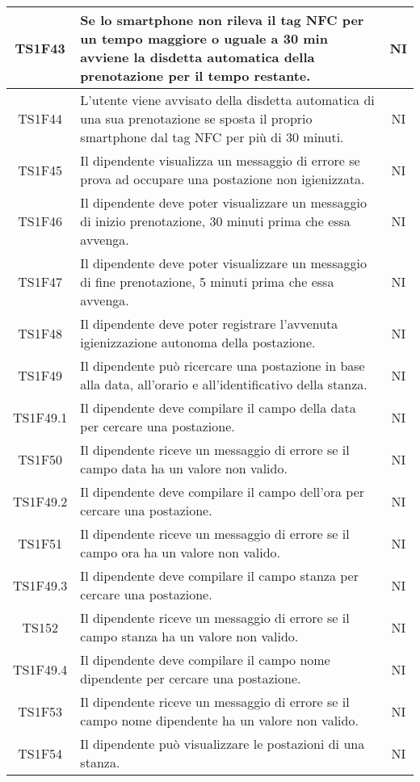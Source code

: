 \begin{center}
\begin{longtable}{|c|p{10cm}|c|}
			\hline					
			TS1F43 & Se lo smartphone non rileva il tag NFC per un tempo maggiore o uguale a 30 min avviene la disdetta automatica della prenotazione per il tempo restante. & NI \\	
			\hline				
			TS1F44 & L’utente viene avvisato della disdetta automatica di una sua prenotazione se sposta il proprio smartphone dal tag NFC per più di 30 minuti. & NI \\	
			\hline				
			TS1F45 & Il dipendente visualizza un messaggio di errore se prova ad occupare una postazione non igienizzata. & NI \\	
			\hline
			TS1F46 & Il dipendente deve poter visualizzare un messaggio di inizio prenotazione, 30 minuti prima che essa avvenga. & NI \\	
			\hline
			TS1F47 & Il dipendente deve poter visualizzare un messaggio di fine prenotazione, 5 minuti prima che essa avvenga. & NI \\	
			\hline
			TS1F48 & Il dipendente deve poter registrare l'avvenuta igienizzazione autonoma della postazione. & NI \\	
			\hline
			TS1F49 & Il dipendente può ricercare una postazione in base alla data, all'orario e all'identificativo della stanza. & NI \\	
			\hline
			TS1F49.1 & Il dipendente deve compilare il campo della data per cercare una postazione. & NI \\	
			\hline
			TS1F50 & Il dipendente riceve un messaggio di errore se il campo data ha un valore non valido. & NI \\	
			\hline
			TS1F49.2 & Il dipendente deve compilare il campo dell'ora per cercare una postazione. & NI \\	
			\hline
			TS1F51 & Il dipendente riceve un messaggio di errore se il campo ora ha un valore non valido. & NI \\	
			\hline			
			TS1F49.3 & Il dipendente deve compilare il campo stanza per cercare una postazione. & NI \\	
			\hline
			TS152 & Il dipendente riceve un messaggio di errore se il campo stanza ha un valore non valido. & NI \\	
			\hline			
			TS1F49.4 & Il dipendente deve compilare il campo nome dipendente per cercare una postazione. & NI \\	
			\hline
			TS1F53 & Il dipendente riceve un messaggio di errore se il campo nome dipendente ha un valore non valido. & NI \\	
			\hline
			TS1F54 & Il dipendente può visualizzare le postazioni di una stanza. & NI \\	

\end{longtable}
\end{center}
